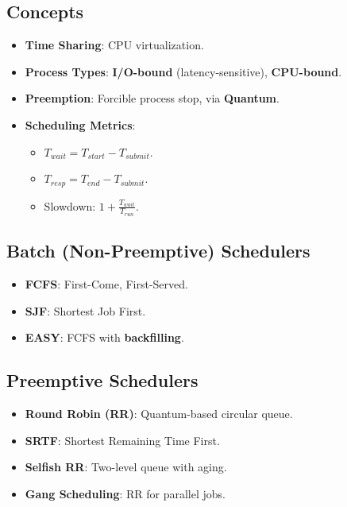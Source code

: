\documentclass[8pt,a4paper]{article}
\begin{document}
\begin{multicols}{2}
\subsection*{Concepts}
\begin{itemize}
    \item \textbf{Time Sharing}: CPU virtualization.
    \item \textbf{Process Types}: \textbf{I/O-bound} (latency-sensitive), \textbf{CPU-bound}.
    \item \textbf{Preemption}: Forcible process stop, via \textbf{Quantum}.
    \item \textbf{Scheduling Metrics}:
    \begin{itemize}
        \item $T_{wait} = T_{start} - T_{submit}$.
        \item $T_{resp} = T_{end} - T_{submit}$.
        \item Slowdown: $1 + \frac{T_{wait}}{T_{run}}$.
    \end{itemize}
\end{itemize}
\subsection*{Batch (Non-Preemptive) Schedulers}
\begin{itemize}
    \item \textbf{FCFS}: First-Come, First-Served.
    \item \textbf{SJF}: Shortest Job First.
    \item \textbf{EASY}: FCFS with \textbf{backfilling}.
\end{itemize}

\subsection*{Preemptive Schedulers}
\begin{itemize}
    \item \textbf{Round Robin (RR)}: Quantum-based circular queue.
    \item \textbf{SRTF}: Shortest Remaining Time First.
    \item \textbf{Selfish RR}: Two-level queue with aging.
    \item \textbf{Gang Scheduling}: RR for parallel jobs.
\end{itemize}


\end{multicols}
\end{document}
